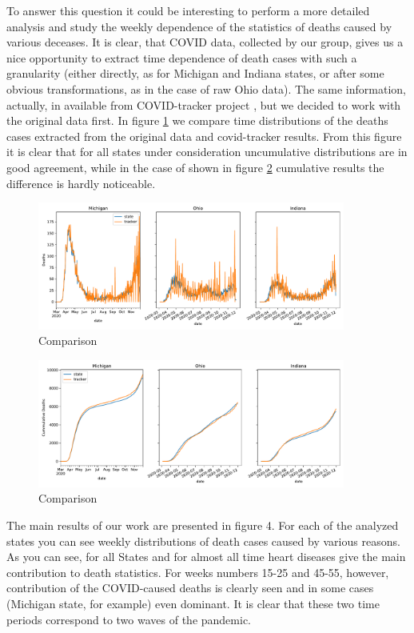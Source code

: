 \documentclass[conference]{IEEEtran}
\begin{document}
To answer this question it could be interesting to perform a more detailed analysis and study the weekly dependence of the statistics of deaths caused by various deceases. It is clear, that COVID data, collected by our group, gives us a nice opportunity to extract time dependence of death cases with such a granularity (either directly, as for Michigan and Indiana states, or after some obvious transformations, as in the case of raw Ohio data). The same information, actually, in available from COVID-tracker project \cite{covid19tracking_covid_nodate}, but we decided to work with the original data first. In figure \ref{fig:RT_comp_NC} we compare time distributions of the deaths cases extracted from the original data and covid-tracker results. From this figure it is clear that for all states under consideration uncumulative distributions are in good agreement, while in the case of shown in figure \ref{fig:RT_comp_CUM} cumulative results the difference is hardly noticeable.

\begin{figure}
  \centering
  \includegraphics[width=0.9\textwidth]{figs/raw_tracker_comp_nc}
  \caption{Comparison}
  \label{fig:RT_comp_NC}
\end{figure}

\begin{figure}
  \centering
  \includegraphics[width=0.9\textwidth]{figs/raw_tracker_comp_cum}
  \caption{Comparison}
  \label{fig:RT_comp_CUM}
\end{figure}

The main results of our work are presented in figure 4. For each of the analyzed states you can see weekly distributions of death cases caused by various reasons. As you can see, for all States and for almost all time heart diseases give the main contribution to death statistics. For weeks numbers 15-25 and 45-55, however, contribution of the COVID-caused deaths is clearly seen and in some cases (Michigan state, for example) even dominant. It is clear that these two time periods correspond to two waves of the pandemic.
\end{document}
